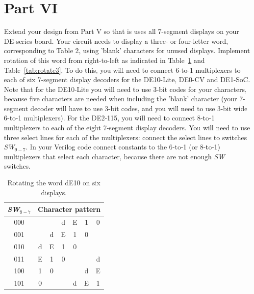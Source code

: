 \documentclass[epsfig,10pt,fullpage]{article}
\begin{document}
\section*{Part VI}
Extend your design from Part V so that is uses all 7-segment displays on your DE-series board.
Your circuit needs to display a three- or four-letter word, corresponding to Table 2,
using 'blank' characters for unused displays. Implement rotation of this word from right-to-left 
as indicated in Table~\ref{tab:rotate2} and Table~\ref{tab:rotate3}.
To do this, you will need to connect 6-to-1 multiplexers to each of six 7-segment display 
decoders for the DE10-Lite, DE0-CV and DE1-SoC. Note that for the DE10-Lite you will need
to use 3-bit codes for your characters, because five characters are needed when including
the 'blank' character (your 7-segment decoder will have to use 3-bit codes, and you will
need to use 3-bit wide 6-to-1 multiplexers).  For the DE2-115, you will need to connect 
8-to-1 multiplexers to each of the eight 7-segment display decoders. 
You will need to use three select lines for each of the multiplexers: connect the select lines 
to switches {\it SW}$_{9-7}$. In your Verilog code connect constants to the 6-to-1 (or
8-to-1) multiplexers that select each character, because there are not enough {\it SW} switches.

\begin{table}[h]
\begin{minipage}[t]{12.5 cm}
\begin{center}
\begin{tabular}{c|cccccc}
{\it SW}$_{9-7}$ & \multicolumn{6}{c}{Character pattern} \\
\hline
{\rule[0mm]{0mm}{5mm}000 } & & & d & E & 1 & 0 \\ 
001 & & d & E & 1 & 0 & \\
010 & d & E & 1 & 0 & & \\
011 & E & 1 & 0 & & & d\\
100 & 1 & 0 & & & d & E \\
101 & 0 & & & d  & E & 1 \\
\end{tabular}
\end{center}
\end{minipage}
\caption{Rotating the word dE10 on six displays.}
\label{tab:rotate2}
\end{table}

\clearpage
\end{document}
